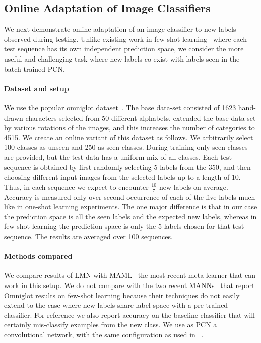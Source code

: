 \documentclass[letterpaper]{article} %
\begin{document}
\subsection{Online Adaptation of Image Classifiers}
\label{sec-expt-rare}
We next demonstrate online adaptation of an image classifier to new labels observed during testing.  Unlike existing work in few-shot learning~\cite{VinyalsBLKW16} where each test sequence has its own independent prediction space, we consider the more useful and challenging task where new labels co-exist with labels seen in the batch-trained PCN.

\paragraph*{Dataset and setup} We use the popular omniglot dataset~\cite{Lake1332}. The base data-set consisted of 1623 hand-drawn characters selected from 50 different alphabets.  \cite{VinyalsBLKW16} extended the base data-set by various rotations of the images, and this increases the number of categories to 4515.
 We create an online variant of this dataset as follows. We arbitrarily select 100 classes as unseen and 250 as seen classes. During training only seen classes are provided, but the test data has a uniform mix of all classes. Each test sequence is obtained by first randomly selecting 5 labels from the 350, and then choosing different input images from the selected labels up to a length of 10.
Thus, in each sequence we expect to encounter $\frac{10}{7}$ new labels on average.   Accuracy is measured only over second occurrence of each of the five labels much like in one-shot learning experiments. The one major difference is that in our case the prediction space is all the seen labels and the expected new labels, whereas in few-shot learning the prediction space is only the 5 labels chosen for that test sequence. The results are averaged over 100 sequences.

\paragraph{Methods compared} We compare results of LMN with MAML~\cite{Finn2017ModelAgnosticMF} the most recent meta-learner that can work in this setup. We do not compare with the two recent MANNs~  that report Omniglot results on few-shot learning because their techniques do not easily extend to the case where new labels share label space with a pre-trained classifier. For reference we also report accuracy on the baseline classifier that will certainly mis-classify examples from the new class. We use as PCN a convolutional network, with the same configuration as used in ~.
\end{document}
